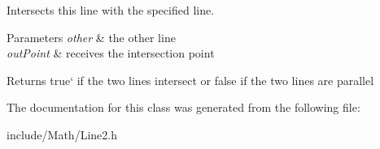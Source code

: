 Intersects this line with the specified line.


\begin{DoxyParams}{Parameters}
{\em other} & the other line \\
\hline
{\em out\+Point} & receives the intersection point \\
\hline
\end{DoxyParams}
\begin{DoxyReturn}{Returns}
\textquotesingle{}true` if the two lines intersect or false if the two lines are parallel 
\end{DoxyReturn}


The documentation for this class was generated from the following file\+:\begin{DoxyCompactItemize}
\item 
include/\+Math/Line2.\+h\end{DoxyCompactItemize}
